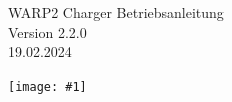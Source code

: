 \documentclass[a4paper,10pt]{article}
\title{}
\author{}
\newcommand{\gfx}[1]{\texttt{[image: \#1]}}
\begin{document}
\pagestyle{empty}
\begin{titlepage}
    \vspace*{-3.08cm}
    \colorbox{boxgray}{}
    \vfill
    \begin{center}
        \Huge
        WARP2 Charger Betriebsanleitung\\\vspace{1cm}
        \large
        Version 2.2.0\\\vspace{0.25cm}
        19.02.2024
    \end{center}
    \vfill \gfx{./img_warp2/resized/warp_perspective_blue_ready}
\end{titlepage}
\newpage
\null
\newpage
\pagestyle{fancy}
\end{document}
